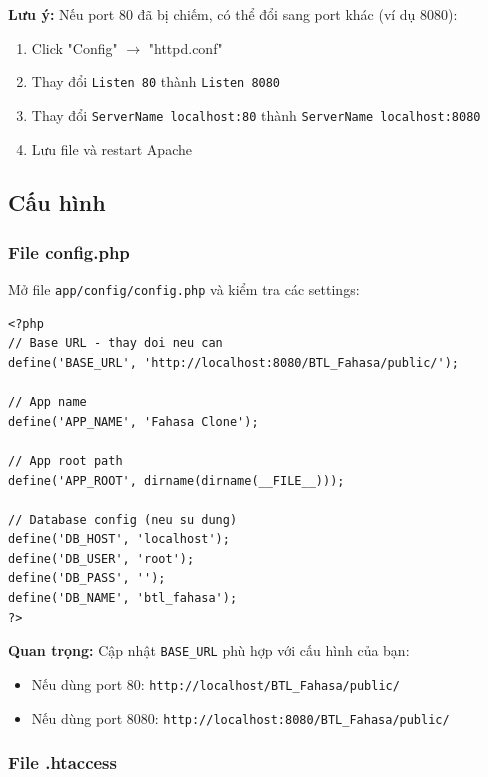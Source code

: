 \textbf{Lưu ý:} Nếu port 80 đã bị chiếm, có thể đổi sang port khác (ví dụ 8080):
\begin{enumerate}
    \item Click "Config" $\rightarrow$ "httpd.conf"
    \item Thay đổi \texttt{Listen 80} thành \texttt{Listen 8080}
    \item Thay đổi \texttt{ServerName localhost:80} thành \texttt{ServerName localhost:8080}
    \item Lưu file và restart Apache
\end{enumerate}

\subsection{Cấu hình}

\subsubsection{File config.php}

Mở file \texttt{app/config/config.php} và kiểm tra các settings:

\begin{lstlisting}[style=phpstyle, caption=File cấu hình config.php]
<?php
// Base URL - thay doi neu can
define('BASE_URL', 'http://localhost:8080/BTL_Fahasa/public/');

// App name
define('APP_NAME', 'Fahasa Clone');

// App root path
define('APP_ROOT', dirname(dirname(__FILE__)));

// Database config (neu su dung)
define('DB_HOST', 'localhost');
define('DB_USER', 'root');
define('DB_PASS', '');
define('DB_NAME', 'btl_fahasa');
?>
\end{lstlisting}

\textbf{Quan trọng:} Cập nhật \texttt{BASE\_URL} phù hợp với cấu hình của bạn:
\begin{itemize}
    \item Nếu dùng port 80: \texttt{http://localhost/BTL\_Fahasa/public/}
    \item Nếu dùng port 8080: \texttt{http://localhost:8080/BTL\_Fahasa/public/}
\end{itemize}

\subsubsection{File .htaccess}

